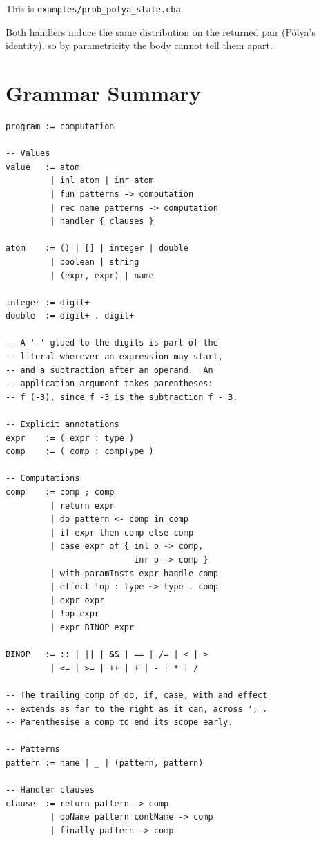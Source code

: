 \documentclass[11pt,a4paper]{article}
\begin{document}
This is \texttt{examples/prob\_polya\_state.cba}.

Both handlers induce the same distribution on the returned pair (P\'{o}lya's
identity), so by parametricity the body cannot tell them apart.

\section{Grammar Summary}
\label{sec:grammar}

\begin{lstlisting}[language={},basicstyle=\ttfamily\small,backgroundcolor=\color{cbaBg},frame=single,rulecolor=\color{cbaFrame},framesep=6pt,xleftmargin=8pt,xrightmargin=8pt,keywordstyle={},commentstyle={}]
program := computation

-- Values
value   := atom
         | inl atom | inr atom
         | fun patterns -> computation
         | rec name patterns -> computation
         | handler { clauses }

atom    := () | [] | integer | double
         | boolean | string
         | (expr, expr) | name

integer := digit+
double  := digit+ . digit+

-- A '-' glued to the digits is part of the
-- literal wherever an expression may start,
-- and a subtraction after an operand.  An
-- application argument takes parentheses:
-- f (-3), since f -3 is the subtraction f - 3.

-- Explicit annotations
expr    := ( expr : type )
comp    := ( comp : compType )

-- Computations
comp    := comp ; comp
         | return expr
         | do pattern <- comp in comp
         | if expr then comp else comp
         | case expr of { inl p -> comp,
                          inr p -> comp }
         | with paramInsts expr handle comp
         | effect !op : type ~> type . comp
         | expr expr
         | !op expr
         | expr BINOP expr

BINOP   := :: | || | && | == | /= | < | >
         | <= | >= | ++ | + | - | * | /

-- The trailing comp of do, if, case, with and effect
-- extends as far to the right as it can, across ';'.
-- Parenthesise a comp to end its scope early.

-- Patterns
pattern := name | _ | (pattern, pattern)

-- Handler clauses
clause  := return pattern -> comp
         | opName pattern contName -> comp
         | finally pattern -> comp


\end{lstlisting}
\end{document}
